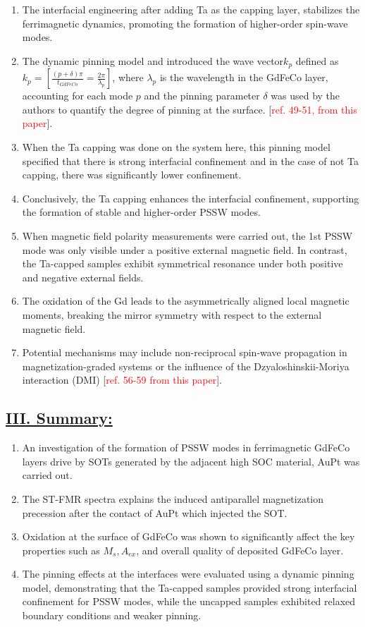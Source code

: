 \begin{enumerate}[1.]
    \item The interfacial engineering after adding Ta as the capping layer, stabilizes the ferrimagnetic dynamics, promoting the formation of higher-order spin-wave modes.
    \item The dynamic pinning model and introduced the wave vector$k_p$ defined as $k_p=\left[\frac{(p+\delta)\pi}{t_{GdFeCo}}=\frac{2\pi}{\lambda_p}\right]$, where $\lambda_p$ is the wavelength in the GdFeCo layer, accounting for each mode  $p$ and the pinning parameter $\delta$ was used by the authors to quantify the degree of pinning at the surface. [\textcolor{red}{ref. 49-51, from this paper}].
    \item When the Ta capping was done on the system here, this pinning model specified that there is strong interfacial confinement and in the case of not Ta capping, there was significantly lower confinement.
    \item Conclusively, the Ta capping enhances the interfacial confinement, supporting the formation of stable and higher-order PSSW modes.
    \item When magnetic field polarity measurements were carried out, the 1st PSSW mode was only visible under a positive external magnetic field. In contrast, the Ta-capped samples exhibit symmetrical resonance under both positive and negative external fields. 
    \item The oxidation of the Gd leads to the asymmetrically aligned local magnetic moments, breaking the mirror symmetry with respect to the external magnetic field.
    \item Potential mechanisms may include non-reciprocal spin-wave propagation in magnetization-graded systems or the influence of the Dzyaloshinskii-Moriya interaction (DMI) [\textcolor{red}{ref. 56-59 from this paper}]. 
\end{enumerate}
\subsection*{\underline{III. Summary:}}
\begin{enumerate}
    \item An investigation of the formation of PSSW modes in ferrimagnetic GdFeCo layers drive by SOTs generated by the adjacent high SOC material, AuPt was carried out.
    \item The ST-FMR spectra explains the induced antiparallel magnetization precession after the contact of AuPt which injected the SOT.
    \item Oxidation at the surface of GdFeCo was shown to significantly affect the key properties such as $M_s,A_{ex}$, and overall quality of deposited GdFeCo layer.
    \item The pinning effects at the interfaces were evaluated using a dynamic pinning model, demonstrating that the Ta-capped samples provided strong interfacial confinement for PSSW modes, while the uncapped samples exhibited relaxed boundary conditions and weaker pinning.
\end{enumerate}
